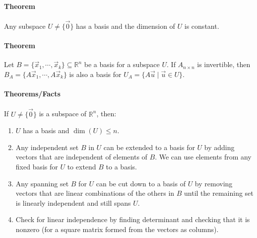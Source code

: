 \paragraph*{Theorem}
Any subspace $U \neq \{\vec{0}\}$ has a basis and the dimension of $U$ is constant.

\paragraph*{Theorem}
Let $B = \{\vec{x}_1, \cdots, \vec{x}_k\} \subseteq \mathbb{R}^n$ be a basis for a subspace $U$.
If $A_{n \times n}$ is invertible, then $B_A = \{A\vec{x}_1, \cdots, A\vec{x}_k\}$ is also a basis for $U_A = \{A\vec{u} \mid \vec{u} \in U\}$.

\paragraph*{Theorems/Facts}
If $U \neq \{\vec{0}\}$ is a subspace of $\mathbb{R}^n$, then:
\begin{enumerate}
    \item $U$ has a basis and $\dim(U) \leq n$.
    \item Any independent set $B$ in $U$ can be extended to a basis for $U$ by adding vectors that are independent of elements of $B$. We can use elements from any fixed basis for $U$ to extend $B$ to a basis.
    \item Any spanning set $B$ for $U$ can be cut down to a basis of $U$ by removing vectors that are linear combinations of the others in $B$ until the remaining set is linearly independent and still spans $U$.
    \item Check for linear independence by finding determinant and checking that it is nonzero (for a square matrix formed from the vectors as columns).
\end{enumerate}

